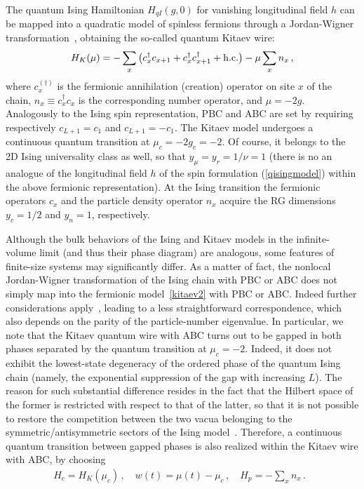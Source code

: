 The quantum Ising Hamiltonian $H_{qI}(g,0)$ for vanishing longitudinal
field $h$ can be mapped into a quadratic model of spinless fermions
through a Jordan-Wigner transformation~\cite{LSM-61, Katsura-62},
obtaining the so-called quantum Kitaev wire:~\cite{Kitaev-01}
\begin{equation}
  H_{K}(\mu) = - \sum_{x} \big( c_x^\dagger c_{x+1} + c_x^\dagger
  c_{x+1}^\dagger + {\rm h.c.}  \big) - \mu \sum_{x} n_x \,,
  \label{kitaev2}
\end{equation}
where $c_x^{(\dagger)}$ is the fermionic annihilation (creation)
operator on site $x$ of the chain, $n_x\equiv c_x^\dagger c_x$ is the
corresponding number operator, and $\mu=-2g$.  Analogously to the
Ising spin representation, PBC and ABC are set by requiring
respectively $c_{L+1} = c_1$ and $c_{L+1} = -c_1$.  The Kitaev model
undergoes a continuous quantum transition at $\mu_c = -2g_c = -2$.  Of
course, it belongs to the 2D Ising universality class as well, so that
$y_\mu= y_r = 1/\nu=1$ (there is no an analogue of the longitudinal
field $h$ of the spin formulation (\ref{qisingmodel}) within the above
fermionic representation).  At the Ising transition the fermionic
operators $c_x$ and the particle density operator $n_x$ acquire the RG
dimensions $y_c=1/2$ and $y_n=1$, respectively.


Although the bulk behaviors of the Ising and Kitaev models in the
infinite-volume limit (and thus their phase diagram) are analogous,
some features of finite-size systems may significantly differ.  As a
matter of fact, the nonlocal Jordan-Wigner transformation of the Ising
chain with PBC or ABC does not simply map into the fermionic
model~\eqref{kitaev2} with PBC or ABC.  Indeed further considerations
apply~\cite{Katsura-62, Pfeuty-70}, leading to a less straightforward
correspondence, which also depends on the parity of the
particle-number eigenvalue. In particular, we note that the Kitaev
quantum wire with ABC turns out to be gapped in both phases separated
by the quantum transition at $\mu_c=-2$. Indeed, it does not exhibit
the lowest-state degeneracy of the ordered phase of the quantum Ising
chain (namely, the exponential suppression of the gap with increasing
$L$).  The reason for such substantial difference resides in the fact
that the Hilbert space of the former is restricted with respect to
that of the latter, so that it is not possible to restore the
competition between the two vacua belonging to the
symmetric/antisymmetric sectors of the Ising model~\cite{Katsura-62,
  Kitaev-01, CPV-14, RV-21}.  Therefore, a continuous quantum
transition between gapped phases is also realized within the Kitaev
wire with ABC, by choosing
\begin{eqnarray}
  H_c = H_K(\mu_c)\,,\quad w(t) = \mu(t)-\mu_c\,,
  \quad H_p = - \sum_{x} n_x\,.\;\;
\label{kitchoice}
\end{eqnarray}



